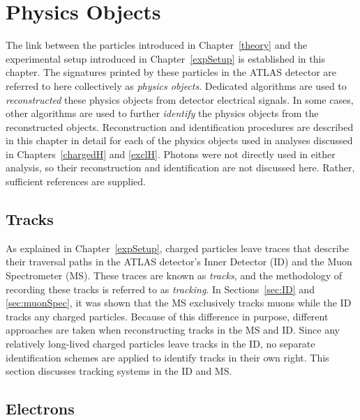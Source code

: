 \chapter{Physics Objects}
\begin{chapabstract}
The link between the particles introduced in Chapter~\ref{theory} and the experimental setup introduced in 
Chapter~\ref{expSetup} is established in this chapter. The signatures printed by these particles in 
the ATLAS detector are referred to here collectively as {\it physics objects}. Dedicated algorithms are used to 
{\it reconstructed} these physics objects from detector electrical signals. In some cases, other algorithms are used to 
further {\it identify} the physics objects from the reconstructed objects. Reconstruction and identification
procedures are described in this chapter in detail for each of the physics objects used in analyses discussed 
in Chapters~\ref{chargedH} and \ref{exclH}. Photons were not directly used in either 
analysis, so their reconstruction and identification are not discussed here. Rather, sufficient references are supplied.   
\end{chapabstract}
\label{obj}

	\section{Tracks}
	\label{sec:tracking}
\par As explained in Chapter~\ref{expSetup}, charged particles leave traces that describe 
their traversal paths in the ATLAS detector's Inner Detector (ID) and the Muon Spectrometer (MS).
These traces are known as {\it tracks}, and the methodology of recording these tracks 
is referred to as {\it tracking}. In Sections~\ref{sec:ID}
 and \ref{sec:muonSpec}, it was shown that the MS exclusively tracks muons 
while the ID tracks any charged particles. Because of this difference in purpose, 
different approaches are taken when reconstructing tracks in the MS and ID. 
Since any relatively long-lived charged particles leave tracks in the ID, no 
separate identification schemes are applied to identify tracks in their own right. 
This section discusses tracking systems in the ID and MS. 
 

	
	\section{Electrons}
	\label{sec:ele}
	

